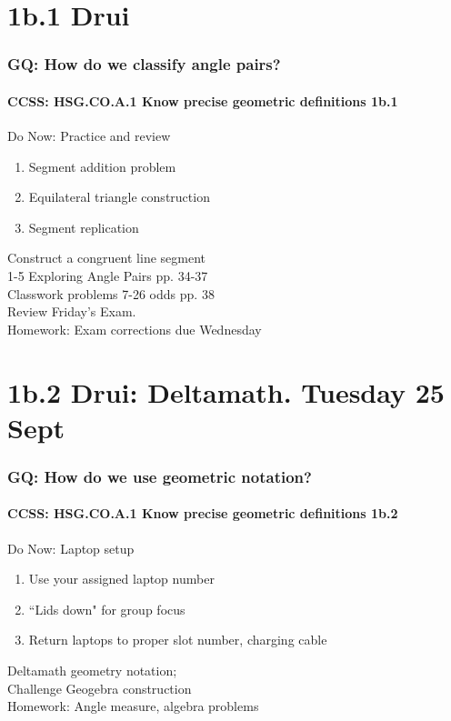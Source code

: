 \documentclass{beamer}
\begin{document}
  \section{1b.1 Drui}
    \frame
    {
      \frametitle{GQ: How do we classify angle pairs?}
      \framesubtitle{CCSS: HSG.CO.A.1 Know precise geometric definitions  \alert{1b.1}}

      \begin{block}{Do Now: Practice and review}
      \begin{enumerate}
          \item Segment addition problem
          \item Equilateral triangle construction
          \item Segment replication
      \end{enumerate}
      \end{block}
      Construct a congruent line segment \\
      1-5 Exploring Angle Pairs pp. 34-37\\
      Classwork problems 7-26 odds pp. 38\\
      Review Friday's Exam.\\
      \vspace{0.5cm}
      Homework: Exam corrections due Wednesday\\
    }

\section{1b.2 Drui: Deltamath. Tuesday 25 Sept}
  \frame
  {
    \frametitle{GQ: How do we use geometric notation?}
    \framesubtitle{CCSS: HSG.CO.A.1 Know precise geometric definitions  \alert{1b.2}}

    \begin{block}{Do Now: Laptop setup}
    \begin{enumerate}
        \item Use your assigned laptop number
        \item ``Lids down" for group focus
        \item Return laptops to proper slot number, charging cable
    \end{enumerate}
    \end{block}
    Deltamath geometry notation; \\Challenge Geogebra construction\\
    \vspace{1cm}
    Homework: Angle measure, algebra problems
  }
\end{document}
